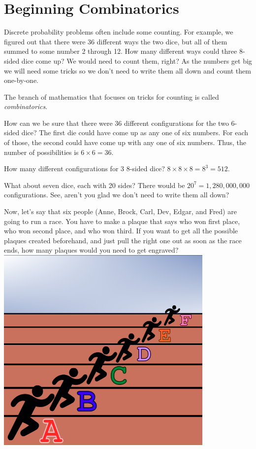 \chapter{Beginning Combinatorics}

Discrete probability problems often include some counting. For
example, we figured out that there were 36 different ways the two dice, 
but all of them summed to some number 2 through 12. How
many different ways could three 8-sided dice come up? We would need to
count them, right? As the numbers get big we will need some tricks so
we don't need to write them all down and count them one-by-one.

The branch of mathematics that focuses on tricks for counting is
called \textit{combinatorics}.

How can we be sure that there were 36 different configurations for the
two 6-sided dice? The first die could have come up as any one of six
numbers. For each of those, the second could have come up with any one
of six numbers. Thus, the number of possibilities is $ 6 \times 6 =
36.$

How many different configurations for 3 8-sided dice?  $8 \times 8
\times 8 = 8^3 = 512$.

What about seven dice, each with 20 sides? There would be $20^7=1,280,000,000$
configurations. See, aren't you glad we don't need to write them all
down?

Now, let's say that six people (Anne, Brock, Carl, Dev, Edgar, and Fred) are
going to run a race. You have to make a plaque that says who won first
place, who won second place, and who won third. If you want to get all
the possible plaques created beforehand, and just pull the right one
out as soon as the race ends, how many plaques would you need to get
engraved?
\includegraphics[width=0.8\textwidth]{Race.png}

